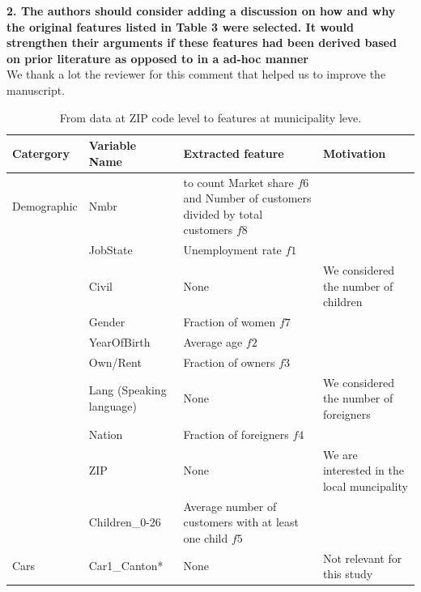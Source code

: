 \documentclass[12pt]{article}
\begin{document}
\textbf{2. The authors should consider adding a discussion on how and why the original features listed in Table 3 were selected. It would strengthen their arguments if these features had been derived based on prior literature as opposed to in a ad-hoc manner}\\
We thank a lot the reviewer for this comment that helped us to improve the manuscript. 
\begin{table}[h]
\tiny
\centering
\caption{From data at ZIP code level to features at municipality leve.}
\label{tab:insurancedata}
\begin{tabular}{l|l|p{6.5cm}|p{3.5cm}}
Catergory							& Variable Name 						& Extracted feature 					& Motivation                   							\\
\hline
\hline
Demographic 					& Nmbr               						& to count Market share $f6$   and Number of customers divided by total customers $f8$ 							&                   			\\ \hline
										& JobState           						& Unemployment rate $f1$        &                            										\\ \hline
										& Civil              							& None                                         &  We considered the number of children       \\ \hline
										& Gender             						& Fraction of women $f7$          &                            \\ \hline
										& YearOfBirth                              & Average age $f2$                    &                            \\ \hline
										& Own/Rent           						& Fraction of owners $f3$          &                 \\ \hline
										& Lang  (Speaking language)     & None                                           & We considered the number of foreigners \\ \hline
										& Nation             						&  Fraction of foreigners $f4$     &                           \\					 \hline					
										&ZIP                & None                                       & We are interested in the local muncipality                    \\ \hline
									    &Children\_0-26     & Average number of customers with at least one child $f5$                                            &       \\ \hline \hline
Cars &Car1\_Canton*      & None                         & Not relevant for this study                           \\ \hline

\end{tabular}
\end{table}
\end{document}

